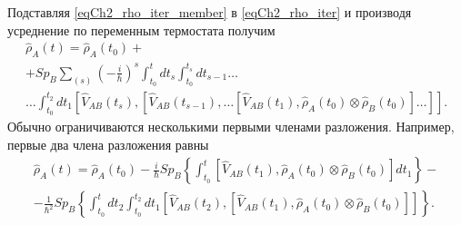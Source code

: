 Подставляя \eqref{eqCh2_rho_iter_member} в \eqref{eqCh2_rho_iter} и производя усреднение 
по переменным термостата получим
\begin{eqnarray}
\hat{\rho}_{A}\left(t\right) = 
\hat{\rho}_{A}\left(t_0\right) + 
\nonumber \\
+ Sp_{B} \sum_{\left(s\right)} \left(- \frac{i}{\hbar}\right)^{s}\int_{t_0}^{t} dt_{s} \int_{t_0}^{t_s} dt_{s-1} \dots
\nonumber \\
\dots \int_{t_0}^{t_{2}} dt_1 
\left[\hat{V}_{AB}\left(t_s\right), 
\left[\hat{V}_{AB}\left(t_{s - 1}\right),
\dotsc
\left[\hat{V}_{AB}\left(t_1\right),
\hat{\rho}_{A}\left(t_0\right)
\otimes
\hat{\rho}_{B}\left(t_0\right)
\right]
\dots
\right]
\right].
\label{eqCh2_rho_sequance}
\end{eqnarray}
Обычно ограничиваются несколькими первыми членами
разложения. Например, первые два члена разложения равны 
\begin{eqnarray}
\hat{\rho}_{A}\left(t\right) = 
\hat{\rho}_{A}\left(t_0\right) - \frac{i}{\hbar} Sp_B \left\{
\int_{t_0}^{t} 
\left[\hat{V}_{AB}\left(t_1\right), \hat{\rho}_{A}\left(t_0\right)
\otimes
\hat{\rho}_{B}\left(t_0\right)
\right]d t_1
\right\} -
\nonumber \\
-
\frac{1}{\hbar^2}
Sp_B \left\{
\int_{t_0}^{t}d t_2 
\int_{t_0}^{t_2} d t_1
\left[\hat{V}_{AB}\left(t_2\right), 
\left[\hat{V}_{AB}\left(t_1\right), 
\hat{\rho}_{A}\left(t_0\right)
\otimes
\hat{\rho}_{B}\left(t_0\right)
\right]
\right]
\right\}.
\nonumber
\end{eqnarray}
